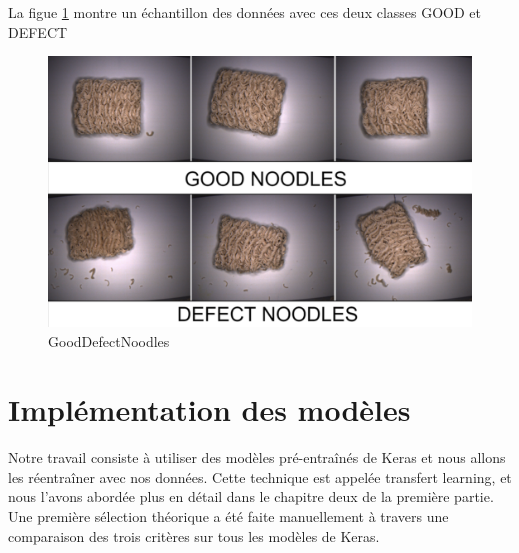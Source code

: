 \newpage
La figue \ref{GoodDefectNoodles} montre un échantillon des données avec ces deux classes GOOD et DEFECT 
\begin{figure}[h]
    \centering
    \includegraphics[width=14cm]{assets/PartTwo/ChapterTwo/GoodDefectNoodles.png}
    \caption{GoodDefectNoodles}
    \label{GoodDefectNoodles}
    \end{figure}

\section{Implémentation des modèles}
Notre travail consiste à utiliser des modèles pré-entraînés de Keras et nous allons les réentraîner avec nos données. Cette technique est appelée transfert learning, et nous l'avons abordée plus en détail dans le chapitre deux de la première partie.  
Une première sélection théorique a été faite manuellement à travers une comparaison des trois critères sur tous les modèles de Keras.  

